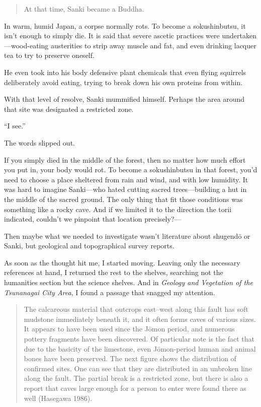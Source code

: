 \documentclass[
    a4paper,
    12pt,
    twoside,
    openany,
    UTF8,
    fontset=windows
]{ctexbook}
\begin{document}
\begin{quote}
At that time, Sanki became a Buddha.
\end{quote}

In warm, humid Japan, a corpse normally rots. To become a sokushinbutsu, it isn't enough to simply die. It is said that severe ascetic practices were undertaken---wood-eating austerities to strip away muscle and fat, and even drinking lacquer tea to try to preserve oneself.

He even took into his body defensive plant chemicals that even flying squirrels deliberately avoid eating, trying to break down his own proteins from within.

With that level of resolve, Sanki mummified himself. Perhaps the area around that site was designated a restricted zone.

``I see.''

The words slipped out.

If you simply died in the middle of the forest, then no matter how much effort you put in, your body would rot. To become a sokushinbutsu in that forest, you'd need to choose a place sheltered from rain and wind, and with low humidity. It was hard to imagine Sanki---who hated cutting sacred trees---building a hut in the middle of the sacred ground. The only thing that fit those conditions was something like a rocky cave. And if we limited it to the direction the torii indicated, couldn't we pinpoint that location precisely?---

Then maybe what we needed to investigate wasn't literature about shugend\=o or Sanki, but geological and topographical survey reports.

As soon as the thought hit me, I started moving. Leaving only the necessary references at hand, I returned the rest to the shelves, searching not the humanities section but the science shelves. And in \textit{Geology and Vegetation of the Tsunanagai City Area}, I found a passage that snagged my attention.

{\bfseries
\begin{quote}
The calcareous material that outcrops east--west along this fault has soft mudstone immediately beneath it, and it often forms caves of various sizes. It appears to have been used since the J\=omon period, and numerous pottery fragments have been discovered. Of particular note is the fact that due to the basicity of the limestone, even J\=omon-period human and animal bones have been preserved. The next figure shows the distribution of confirmed sites. One can see that they are distributed in an unbroken line along the fault. The partial break is a restricted zone, but there is also a report that caves large enough for a person to enter were found there as well (Hasegawa 1986).
\end{quote}
}
\end{document}

